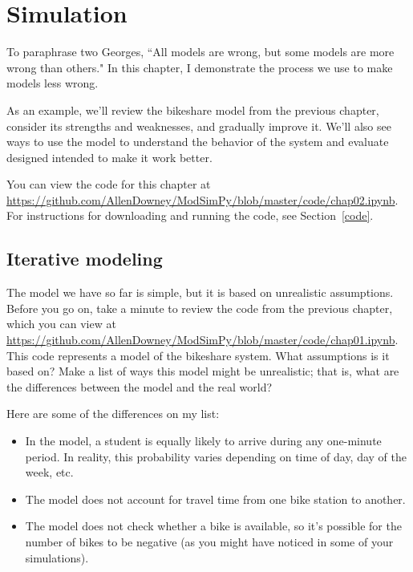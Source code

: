 \documentclass[12pt]{book}
\theoremstyle{exercise}
\begin{document}
\chapter{Simulation}

To paraphrase two Georges, ``All models are wrong, but some models are more wrong than others."  In this chapter, I demonstrate the process we use to make models less wrong.

As an example, we'll review the bikeshare model from the previous chapter, consider its strengths and weaknesses, and gradually improve it.  We'll also see ways to use the model to understand the behavior of the system and evaluate designed intended to make it work better.

You can view the code for this chapter at \url{https://github.com/AllenDowney/ModSimPy/blob/master/code/chap02.ipynb}.  For instructions for downloading and running the code, see Section~\ref{code}.


\section{Iterative modeling}

The model we have so far is simple, but it is based on unrealistic assumptions.  Before you go on, take a minute to review the code from the previous chapter, which you can view at \url{https://github.com/AllenDowney/ModSimPy/blob/master/code/chap01.ipynb}.  This code represents a model of the bikeshare system.  What assumptions is it based on?  Make a list of ways this model might be unrealistic; that is, what are the differences between the model and the real world?

Here are some of the differences on my list:

\begin{itemize}

\item In the model, a student is equally likely to arrive during any one-minute period.  In reality, this probability varies depending on time of day, day of the week, etc.

\item The model does not account for travel time from one bike station to another.

\item The model does not check whether a bike is available, so it's possible for the number of bikes to be negative (as you might have noticed in some of your simulations).

\end{itemize}
\end{document}
